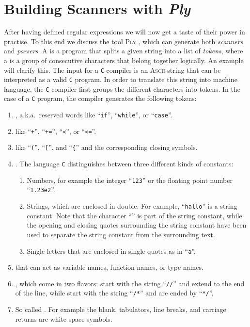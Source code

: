 \chapter{Building Scanners with \textsl{Ply}}
After having defined regular expressions we will now get a taste of their power in practise.
To this end we discuss the tool \textsc{Ply} , which can generate both 
\emph{scanners} and \emph{parsers}.
A    is a program that splits a given string into a list of \emph{tokens}, 
where a   is a group of consecutive characters that belong together logically.  An example
will clarify this.   
The input for a \texttt{C}-compiler is an \textsc{Ascii}-string that can be interpreted as a
valid \texttt{C} program.  In order to translate this string into machine language, the
\texttt{C}-compiler first groups the different characters into tokens.  In the case of a \texttt{C}
program, the compiler generates the following tokens:
\begin{enumerate}
\item {}, a.k.a.~reserved words like ``\texttt{if}'', ``\texttt{while}'', or ``\texttt{case}''.
\item {} like ``\texttt{+}'', ``\texttt{+=}'', ``\texttt{<}'', or
      ``\texttt{<=}''. 
\item {} like ``\texttt{(}'', ``\texttt{[}'', and ``\texttt{\{}'' and the
      corresponding closing symbols.
\item {}.  The language \texttt{C} distinguishes between three different kinds of constants:
      \begin{enumerate}
      \item Numbers, for example the integer ``\texttt{123}'' or the floating point number ``\texttt{1.23e2}''.
      \item Strings, which are enclosed in double.  For example,
            ``\texttt{hallo}'' is a string constant.  Note that the character
            ``\texttt{}'' is part of the string constant, while the opening and closing
            quotes surrounding the string constant have been used to separate the string constant
            from the surrounding text. 
      \item Single letters that are enclosed in single quotes as in
            ``\texttt{a}''.
      \end{enumerate}
\item {} that can act as variable names, function names, or type names.
\item {}, which come in two flavors:   start with the string
      ``\texttt{//}'' and extend to the end of the line, while  start with
      the string ``\texttt{/*}'' and are ended by ``\texttt{*/}''.
\item So called .  For example the blank, tabulators, line breaks, and
      carriage returns are white space symbols.
\end{enumerate}

